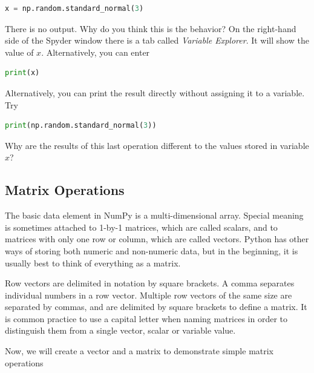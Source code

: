 \begin{lstlisting}[language=Python]
	x = np.random.standard_normal(3)  
\end{lstlisting}

There is no output. Why do you think this is the behavior? \QA On the right-hand side of the Spyder window there is a tab called \textit{Variable Explorer}. It will show the value of $x$. Alternatively, you can enter 

\begin{lstlisting}[language=Python]
	print(x)
\end{lstlisting}

Alternatively, you can print the result directly without assigning it to a variable. Try

\begin{lstlisting}[language=Python]
	print(np.random.standard_normal(3))
\end{lstlisting}

Why are the results of this last operation different to the values stored in variable $x$? \QA



\subsection{Matrix Operations}

The basic data element in NumPy is a multi-dimensional array. 
Special meaning is sometimes attached to 1-by-1 matrices, which are
called scalars, and to matrices with only one row or column, which
are called vectors. Python has other ways of storing both numeric
and non-numeric data, but in the beginning, it is usually best to
think of everything as a matrix.

Row vectors are delimited in notation by square brackets. A comma separates individual numbers in a row vector. Multiple row vectors of the same size are separated by commas, and are delimited by square brackets to define a matrix. It is common practice to use a capital letter when naming matrices in order to distinguish them from a single vector, scalar or variable value. 

Now, we will create a vector and a matrix to demonstrate simple matrix operations \vs

